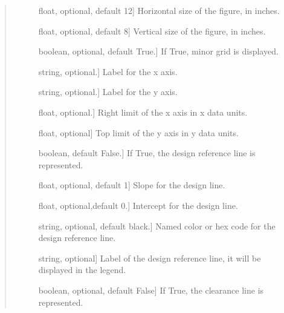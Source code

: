 \documentclass[letterpaper,10pt,english]{sphinxmanual}
\begin{document}
\begin{fulllineitems}
\begin{quote}
\begin{description}
\begin{description}
\item[{}] \leavevmode{[}float, optional, default 12{]}
Horizontal size of the figure, in inches.

\item[{}] \leavevmode{[}float, optional, default 8{]}
Vertical size of the figure, in inches.

\item[{}] \leavevmode{[}boolean, optional, default True.{]}
If True, minor grid is displayed.

\item[{}] \leavevmode{[}string, optional.{]}
Label for the x axis.

\item[{}] \leavevmode{[}string, optional.{]}
Label for the y axis.

\item[{}] \leavevmode{[}float, optional.{]}
Right limit of the x axis in x data units.

\item[{}] \leavevmode{[}float, optional{]}
Top limit of the y axis in y data units.

\item[{}] \leavevmode{[}boolean, default False.{]}
If True, the design reference line is represented.

\item[{}] \leavevmode{[}float, optional, default 1{]}
Slope for the design line.

\item[{}] \leavevmode{[}float, optional,default 0.{]}
Intercept for the design line.

\item[{}] \leavevmode{[}string, optional, default black.{]}
Named color or hex code for the design reference line.

\item[{}] \leavevmode{[}string, optional{]}
Label of the design reference line, it will 
be displayed in the legend.

\item[{}] \leavevmode{[}boolean, optional, default False{]}
If True, the clearance line is represented.


\end{description}
\end{description}
\end{quote}
\end{fulllineitems}
\end{document}
